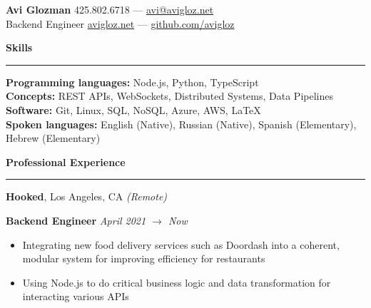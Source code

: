 \documentclass[10pt]{article}
\begin{document}
	\pagestyle{empty}
	\begin{center}
		{\huge \textbf{Avi Glozman}} {\large \hfill 425.802.6718 --- \href{mailto:avi@avigloz.net}{avi@avigloz.net}}\\
		\vspace{1.25mm}
		{\large Backend Engineer \hfill \href{https://avigloz.net}{avigloz.net} --- \href{https://github.com/avigloz}{github.com/avigloz}}
	\end{center}
	
	\begin{flushleft}	
		\vspace{-0.5mm}
		{\large \raggedright \textbf{Skills}}
		\vspace{1.25mm}
	
		\hrule
	
		\vspace{2.25mm}
		\textbf{Programming languages:} Node.js, Python, TypeScript\\
		\vspace{0.5mm}
		\textbf{Concepts:} REST APIs, WebSockets, Distributed Systems, Data Pipelines\\
		\vspace{0.5mm}
		\textbf{Software:} Git, Linux, SQL, NoSQL, Azure, AWS, \LaTeX\\ 
		\vspace{0.5mm}
		\textbf{Spoken languages:} English (Native), Russian (Native), Spanish (Elementary),  Hebrew (Elementary)

		\vspace{2mm}
		{\large \raggedright \textbf{Professional Experience}}
		\vspace{1.25mm}
	
		\hrule

		\vspace{2.25mm}
		\textbf{Hooked}, Los Angeles, CA \textit{(Remote)}\\
		\begin{leftli}
         {\small \textbf{Backend Engineer}  \hfill \textit{\small April 2021 $\rightarrow$ Now}}
			\begin{itemize}
				\item Integrating new food delivery services such as Doordash into a coherent, modular system for improving efficiency for restaurants
				\vspace{-2mm}
				\item Using Node.js to do critical business logic and data transformation for interacting various APIs
			\end{itemize}
		\end{leftli}


\end{flushleft}
\end{document}
